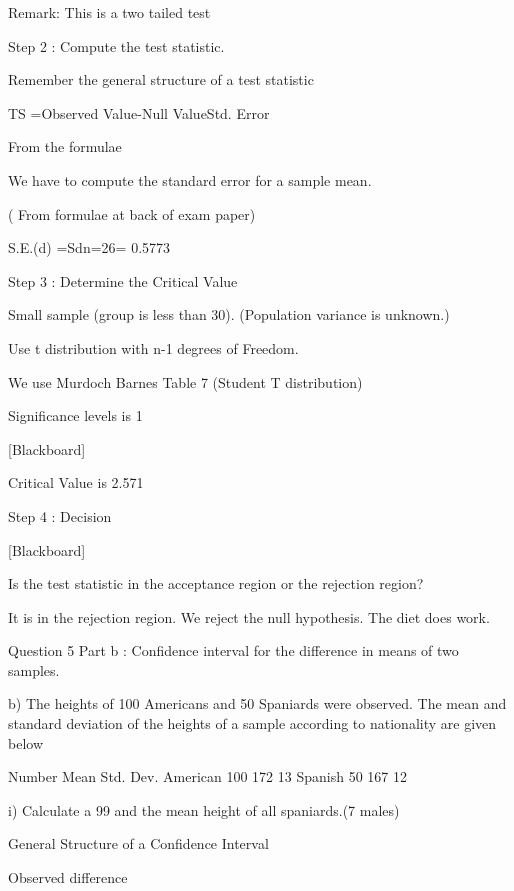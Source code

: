 Remark: This is a two tailed test
 
 
Step 2 : Compute the test statistic.
 

Remember the general structure of a test statistic
 
TS =Observed Value-Null ValueStd. Error 
 
 
 
From the formulae
 
We have to compute the standard error for a sample mean. 
 
( From formulae at back of exam paper)
 
 S.E.(d) =Sdn=26= 0.5773 
 
 
 
 
 
Step 3 :  Determine the Critical Value
 
Small sample (group is less than 30).
(Population variance is unknown.)
 
Use t distribution with n-1 degrees of Freedom.
 
We use Murdoch Barnes Table 7 (Student T distribution)
 
Significance levels is 1%
 
[Blackboard]
 
 
Critical Value is 2.571
 
 
Step 4 : Decision
 

[Blackboard]
 
Is the test statistic in the acceptance region or the rejection region?
 
It is in the rejection region. We reject the null hypothesis. The diet does work.
 
  
 
Question 5 Part b : Confidence interval for the difference in means of two samples.
 
b) The heights of 100 Americans and 50 Spaniards were observed.
 The mean and standard deviation of the heights of a sample according to nationality are given below
 
 
Number
Mean
Std. Dev.
American
100
172
13
Spanish
50
167
12
 
i)        Calculate a 99%
and the mean height of all spaniards.(7 males)
 
General Structure of a Confidence Interval
 


 
            
Observed difference
 
